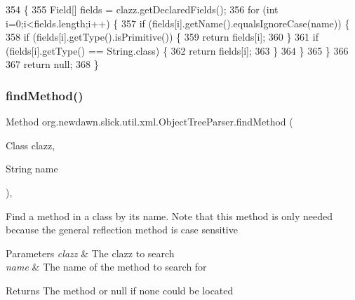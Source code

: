 \begin{DoxyCode}
354                                                       \{
355         Field[] fields = clazz.getDeclaredFields();
356         \textcolor{keywordflow}{for} (\textcolor{keywordtype}{int} i=0;i<fields.length;i++) \{
357             \textcolor{keywordflow}{if} (fields[i].getName().equalsIgnoreCase(name)) \{
358                 \textcolor{keywordflow}{if} (fields[i].getType().isPrimitive()) \{
359                     \textcolor{keywordflow}{return} fields[i];
360                 \}
361                 \textcolor{keywordflow}{if} (fields[i].getType() == String.class) \{
362                     \textcolor{keywordflow}{return} fields[i];
363                 \}
364             \}
365         \}
366         
367         \textcolor{keywordflow}{return} null;
368     \}
\end{DoxyCode}
\mbox{\label{classorg_1_1newdawn_1_1slick_1_1util_1_1xml_1_1_object_tree_parser_adeb37b83c1082cd794c9ec1ca5da9e9f}} 
\subsubsection{\texorpdfstring{find\+Method()}{findMethod()}\hspace{0.1cm}{\footnotesize\ttfamily [1/2]}}
{\footnotesize\ttfamily Method org.\+newdawn.\+slick.\+util.\+xml.\+Object\+Tree\+Parser.\+find\+Method (\begin{DoxyParamCaption}\item[{Class}]{clazz,  }\item[{String}]{name }\end{DoxyParamCaption})\hspace{0.3cm}{\ttfamily [inline]}, {\ttfamily [private]}}

Find a method in a class by it\textquotesingle{}s name. Note that this method is only needed because the general reflection method is case sensitive


\begin{DoxyParams}{Parameters}
{\em clazz} & The clazz to search \\
\hline
{\em name} & The name of the method to search for \\
\hline
\end{DoxyParams}
\begin{DoxyReturn}{Returns}
The method or null if none could be located 
\end{DoxyReturn}

